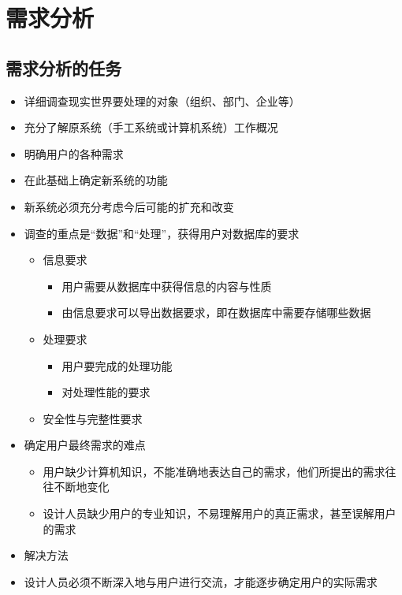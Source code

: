 \section{需求分析}

\subsection{需求分析的任务}
\begin{itemize}
    \item 详细调查现实世界要处理的对象（组织、部门、企业等）
    \item 充分了解原系统（手工系统或计算机系统）工作概况
    \item 明确用户的各种需求
    \item 在此基础上确定新系统的功能
    \item 新系统必须充分考虑今后可能的扩充和改变
    \item 调查的重点是“数据”和“处理”，获得用户对数据库的要求
    \begin{itemize}
        \item 信息要求
        \begin{itemize}
            \item 用户需要从数据库中获得信息的内容与性质
            \item 由信息要求可以导出数据要求，即在数据库中需要存储哪些数据
        \end{itemize}
        \item 处理要求
        \begin{itemize}
            \item 用户要完成的处理功能
            \item 对处理性能的要求
        \end{itemize}
        \item 安全性与完整性要求
    \end{itemize}
    \item 确定用户最终需求的难点
    \begin{itemize}
        \item 用户缺少计算机知识，不能准确地表达自己的需求，他们所提出的需求往往不断地变化
        \item 设计人员缺少用户的专业知识，不易理解用户的真正需求，甚至误解用户的需求
    \end{itemize}
    \item 解决方法
    \item 设计人员必须不断深入地与用户进行交流，才能逐步确定用户的实际需求  
\end{itemize}


